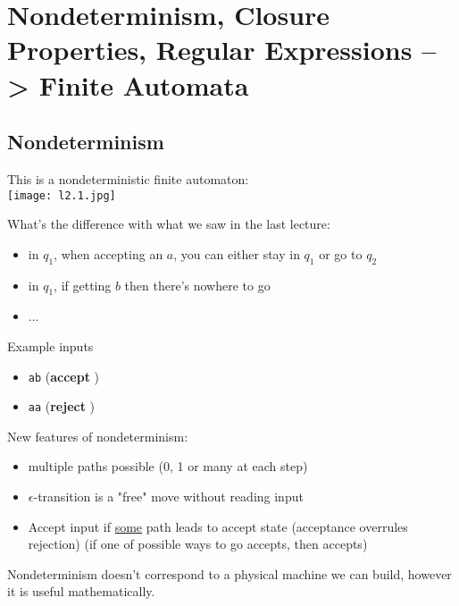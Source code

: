 \chapter{Nondeterminism, Closure Properties, Regular Expressions --> Finite Automata}

\section{Nondeterminism}

\begin{eg}\label{eg: NFA}
    This is a nondeterministic finite automaton:\\
    \texttt{[image: l2.1.jpg]}
    
    What's the difference with what we saw in the last lecture:
    \begin{itemize}
        \item in \(q_1\), when accepting an \(a\), you can either stay in \(q_1\) or go to \(q_2\)
        \item in \(q_1\), if getting \(b\) then there's nowhere to go 
        \item ...
    \end{itemize}

    Example inputs
    \begin{itemize}
        \item \verb|ab| (\textbf{accept} )
        \item \verb|aa| (\textbf{reject} )
    \end{itemize}

\end{eg}

New features of nondeterminism:
\begin{itemize}
    \item multiple paths possible (0, 1 or many at each step)
    \item \(\epsilon\)-transition is a "free" move without reading input
    \item Accept input if \underline{some} path leads to accept state (acceptance overrules rejection) (if one of possible ways to go accepts, then accepts)
\end{itemize}

Nondeterminism doesn't correspond to a physical machine we can build, however it is useful mathematically.


